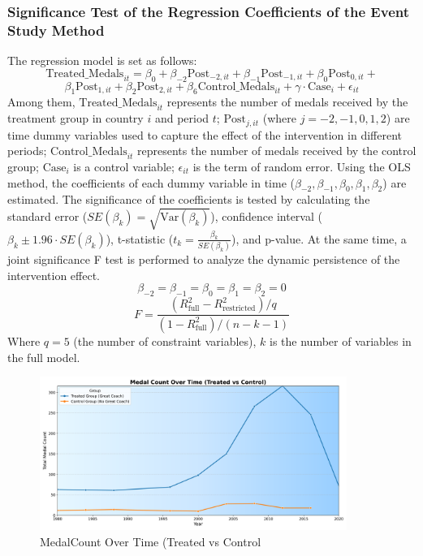 \documentclass{mcmthesis}  %
\begin{document}
\subsubsection{Significance Test of the Regression Coefficients of the Event Study Method}

\hspace*{1.5em}The regression model is set as follows: $$\text{Treated\_Medals}_{it} = \beta_0 + \beta_{-2} \text{Post}_{-2,it} + \beta_{-1} \text{Post}_{-1,it} + \beta_0 \text{Post}_{0,it} + $$$$\beta_1 \text{Post}_{1,it}+ \beta_2 \text{Post}_{2,it} + \beta_6 \text{Control\_Medals}_{it} + \gamma \cdot \text{Case}_i + \epsilon_{it}$$
Among them, \(\text{Treated\_Medals}_{it}\) represents the number of medals received by the treatment group in country \(i\) and period \(t\); \(\text{Post}_{j,it}\) (where \(j = -2, -1, 0, 1, 2\)) are time dummy variables used to capture the effect of the intervention in different periods; \(\text{Control\_Medals}_{it}\) represents the number of medals received by the control group; \(\text{Case}_i\) is a control variable; \(\epsilon_{it}\) is the term of random error. Using the OLS method, the coefficients of each dummy variable in time (\(\beta_{-2}, \beta_{-1}, \beta_0, \beta_1, \beta_2\)) are estimated. The significance of the coefficients is tested by calculating the standard error (\(SE(\beta_k) = \sqrt{\text{Var}(\beta_k)}\)), confidence interval (\(\beta_k \pm 1.96 \cdot SE(\beta_k)\)), t-statistic (\(t_k = \frac{\beta_k}{SE(\beta_k)}\)), and p-value. At the same time, a joint significance F test is performed to analyze the dynamic persistence of the intervention effect.
$$\beta_{-2} = \beta_{-1} = \beta_0 = \beta_1 = \beta_2 = 0$$
$$F = \frac{(R^2_{\text{full}} - R^2_{\text{restricted}})/q}{(1 - R^2_{\text{full}})/(n - k - 1)}$$
Where \(q = 5\) (the number of constraint variables), \(k\) is the number of variables in the full model.

\begin{figure}[h]  %
\small
\centering  %
\includegraphics[width=10cm]{c.png}  %
\caption{MedalCount Over Time (Treated vs Control}  %
\end{figure}  %
\end{document}
